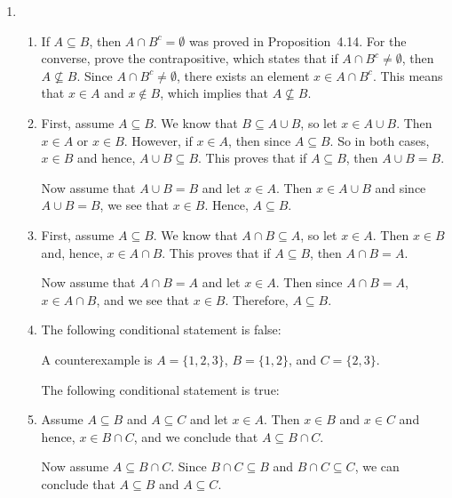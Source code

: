 \begin{enumerate}
\item \begin{enumerate}
\item If $A \subseteq B$, then $A \cap B^c = \emptyset$ was proved in Proposition~4.14.  For the converse, prove the contrapositive, which states that if $A \cap B^c \ne \emptyset$, then 
$A \not\subseteq B$. Since $A \cap B^c \ne \emptyset$, there exists an element 
$x \in A \cap B^c$.  This means that $x \in A$ and $x \notin B$, which implies that 
$A \not\subseteq B$.

\item First, assume $A \subseteq B$.  We know that $B \subseteq A \cup B$, so let 
$x \in A \cup B$.  Then $x \in A$ or $x \in B$. However, if $x \in A$, then since 
$A \subseteq B$.  So in both cases, $x \in B$ and hence, $A \cup B \subseteq B$.  This proves that if $A \subseteq B$, then $A \cup B = B$.

Now assume that $A \cup B = B$ and let $x \in A$. Then $x \in A \cup B$ and since 
$A \cup B = B$, we see that $x \in B$.  Hence, $A \subseteq B$.

\item First, assume $A \subseteq B$.  We know that $A \cap B \subseteq A$, so let 
$x \in A$.  Then $x \in B$ and, hence, $x \in A \cap B$. This proves that if $A \subseteq B$, then $A \cap B = A$.

Now assume that $A \cap B = A$ and let $x \in A$. Then since $A \cap B = A$, $x \in A \cap B$, and we see that $x \in B$.  Therefore, $A \subseteq B$.

\item The following conditional statement is false:
A counterexample is $A = \{1, 2, 3 \}$, $B = \{1, 2 \}$, and $C = \{2, 3 \}$.

The following conditional statement is true:
\item Assume $A \subseteq B$ and $A \subseteq C$ and let $x \in A$.  Then $x \in B$ and $x \in C$ and hence, $x \in B \cap C$, and we conclude that $A \subseteq B \cap C$.

Now assume $A \subseteq B \cap C$.  Since $B \cap C \subseteq B$ and $B \cap C \subseteq C$, we can conclude that $A \subseteq B$ and $A \subseteq C$.
\end{enumerate}



\end{enumerate}
